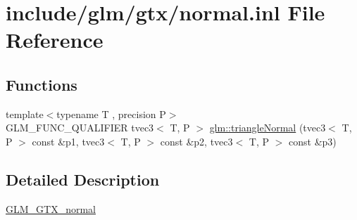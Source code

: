 \hypertarget{normal_8inl}{}\section{include/glm/gtx/normal.inl File Reference}
\label{normal_8inl}
\subsection*{Functions}
\begin{DoxyCompactItemize}
\item 
{\footnotesize template$<$typename T , precision P$>$ }\\G\+L\+M\+\_\+\+F\+U\+N\+C\+\_\+\+Q\+U\+A\+L\+I\+F\+I\+ER tvec3$<$ T, P $>$ \hyperlink{group__gtx__normal_ga7842850bcda582f1756883e3ed950e14}{glm\+::triangle\+Normal} (tvec3$<$ T, P $>$ const \&p1, tvec3$<$ T, P $>$ const \&p2, tvec3$<$ T, P $>$ const \&p3)
\end{DoxyCompactItemize}


\subsection{Detailed Description}
\hyperlink{group__gtx__normal}{G\+L\+M\+\_\+\+G\+T\+X\+\_\+normal} 